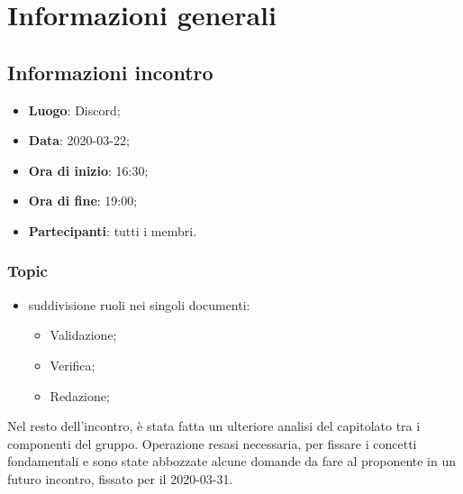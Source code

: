 \section{Informazioni generali}
\subsection{Informazioni incontro}
\begin{itemize}
\item \textbf{Luogo}: Discord\glo;
\item \textbf{Data}: 2020-03-22;
\item \textbf{Ora di inizio}: 16:30;
\item \textbf{Ora di fine}: 19:00;
\item \textbf{Partecipanti}: tutti i membri.
\end{itemize}

\subsubsection{Topic}
\begin{itemize}
\item suddivisione ruoli nei singoli documenti: 
\begin{itemize}
\item Validazione;
\item Verifica;
\item Redazione;
\end{itemize}
\end{itemize}
Nel resto dell'incontro, è stata fatta un ulteriore analisi del capitolato tra i componenti del gruppo. Operazione resasi necessaria, per fissare i concetti fondamentali e sono state abbozzate alcune domande da fare al proponente in un futuro incontro, fissato per il 2020-03-31.